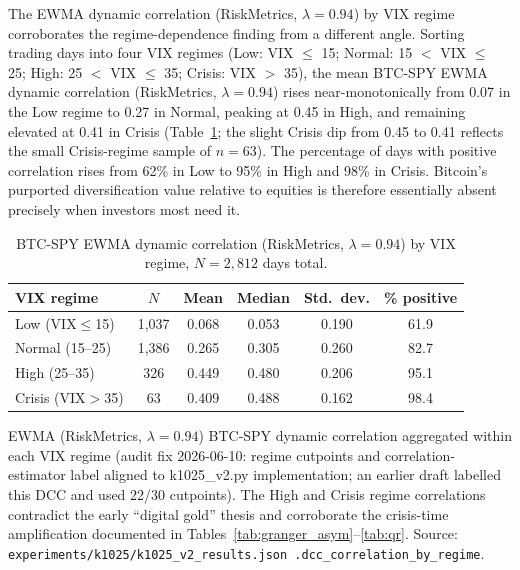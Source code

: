 \documentclass[11pt,a4paper]{article}
\begin{document}
The EWMA dynamic correlation (RiskMetrics, $\lambda=0.94$) by VIX regime corroborates the regime-dependence finding from a different angle. Sorting trading days into four VIX regimes (Low: VIX $\le$ 15; Normal: 15 $<$ VIX $\le$ 25; High: 25 $<$ VIX $\le$ 35; Crisis: VIX $>$ 35), the mean BTC-SPY EWMA dynamic correlation (RiskMetrics, $\lambda=0.94$) rises near-monotonically from 0.07 in the Low regime to 0.27 in Normal, peaking at 0.45 in High, and remaining elevated at 0.41 in Crisis (Table~\ref{tab:dcc}; the slight Crisis dip from 0.45 to 0.41 reflects the small Crisis-regime sample of $n = 63$). The percentage of days with positive correlation rises from 62\% in Low to 95\% in High and 98\% in Crisis. Bitcoin's purported diversification value relative to equities is therefore essentially absent precisely when investors most need it.

\begin{table}[H]
\centering
\caption{BTC-SPY EWMA dynamic correlation (RiskMetrics, $\lambda=0.94$) by VIX regime, $N = 2{,}812$ days total.}
\label{tab:dcc}
\begin{tabular}{lccccc}
\toprule
VIX regime    & $N$  & Mean & Median & Std.\ dev. & \% positive \\
\midrule
Low (VIX$\le$15)        & 1{,}037 & 0.068 & 0.053 & 0.190 & 61.9 \\
Normal (15--25)         & 1{,}386 & 0.265 & 0.305 & 0.260 & 82.7 \\
High (25--35)           & 326   & 0.449 & 0.480 & 0.206 & 95.1 \\
Crisis (VIX$>$35)       & 63    & 0.409 & 0.488 & 0.162 & 98.4 \\
\bottomrule
\end{tabular}
\begin{flushleft}
\footnotesize EWMA (RiskMetrics, $\lambda=0.94$) BTC-SPY dynamic correlation aggregated within each VIX regime (audit fix 2026-06-10: regime cutpoints and correlation-estimator label aligned to k1025\_v2.py implementation; an earlier draft labelled this DCC and used 22/30 cutpoints). The High and Crisis regime correlations contradict the early ``digital gold'' thesis and corroborate the crisis-time amplification documented in Tables~\ref{tab:granger_asym}--\ref{tab:qr}. Source: \texttt{experiments/k1025/k1025\_v2\_results.json .dcc\_correlation\_by\_regime}.
\end{flushleft}
\end{table}
\end{document}
